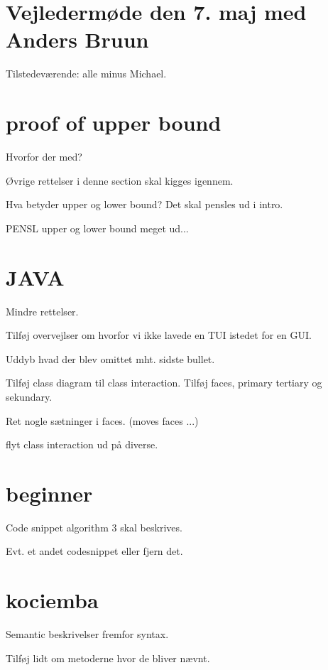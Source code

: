 \documentclass{report}
\begin{document}
\section{Vejlederm\o{}de den 7. maj med Anders Bruun}

Tilstedev\ae{}rende: alle minus Michael.

\section{proof of upper bound}
Hvorfor der med?

\O{}vrige rettelser i denne section skal kigges igennem. 

Hva betyder upper og lower bound? Det skal pensles ud i intro. 

PENSL upper og lower bound meget ud... 

\section{JAVA}
Mindre rettelser. 

Tilf\o{}j overvejlser om hvorfor vi ikke lavede en TUI istedet for en GUI. 

Uddyb hvad der blev omittet mht. sidste bullet. 

Tilf\o{}j class diagram til class interaction. Tilf\o{}j faces, primary tertiary og sekundary. 

Ret nogle s\ae{}tninger i faces. (moves faces ...)

flyt class interaction ud p\aa{} diverse. 


\section{beginner}
Code snippet algorithm 3 skal beskrives. 

Evt. et andet codesnippet eller fjern det.  

\section{kociemba}
Semantic beskrivelser fremfor syntax. 

Tilf\o{}j lidt om metoderne hvor de bliver n\ae{}vnt. 
\end{document}
